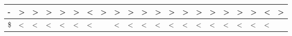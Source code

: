 \begin{tabular}{|l|l|l|l|l|l|l|l|l|l|l|l|l|l|l|l|l|l|l|l|l|}
\hline
-&\textgreater&\textgreater&\textgreater&\textgreater&\textgreater&\textless&\textgreater&\textgreater&\textgreater&\textgreater&\textgreater&\textgreater&\textgreater&\textgreater&\textgreater&\textgreater&\textgreater&\textgreater&\textless&\textgreater\\
\hline
\$&\textless&\textless&\textless&\textless&\textless&\textless&&\textless&\textless&\textless&\textless&\textless&\textless&\textless&\textless&\textless&\textless&\textless&\textless&\\
\hline
\end{tabular}

